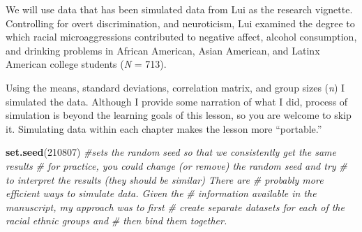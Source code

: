 \documentclass[
  11pt,
]{book}
\newenvironment{Shaded}{\begin{snugshade}}{\end{snugshade}}
\newcommand{\CommentTok}[1]{\textcolor[rgb]{0.37,0.37,0.37}{\textit{#1}}}
\newcommand{\DecValTok}[1]{\textcolor[rgb]{0.06,0.06,0.06}{#1}}
\newcommand{\FunctionTok}[1]{\textcolor[rgb]{0.27,0.27,0.27}{\textbf{#1}}}
\newcommand{\NormalTok}[1]{#1}
\begin{document}
We will use data that has been simulated data from Lui \citeyearpar{lui_racial_2020} as the research vignette. Controlling for overt discrimination, and neuroticism, Lui examined the degree to which racial microaggressions contributed to negative affect, alcohol consumption, and drinking problems in African American, Asian American, and Latinx American college students (\emph{N} = 713).

Using the means, standard deviations, correlation matrix, and group sizes (\emph{n}) I simulated the data. Although I provide some narration of what I did, process of simulation is beyond the learning goals of this lesson, so you are welcome to skip it. Simulating data within each chapter makes the lesson more ``portable.''

\begin{Shaded}
\begin{Highlighting}[]
\FunctionTok{set.seed}\NormalTok{(}\DecValTok{210807}\NormalTok{)  }\CommentTok{\#sets the random seed so that we consistently get the same results}
\CommentTok{\# for practice, you could change (or remove) the random seed and try}
\CommentTok{\# to interpret the results (they should be similar) There are}
\CommentTok{\# probably more efficient ways to simulate data. Given the}
\CommentTok{\# information available in the manuscript, my approach was to first}
\CommentTok{\# create separate datasets for each of the racial ethnic groups and}
\CommentTok{\# then bind them together.}


\end{Highlighting}
\end{Shaded}
\end{document}
